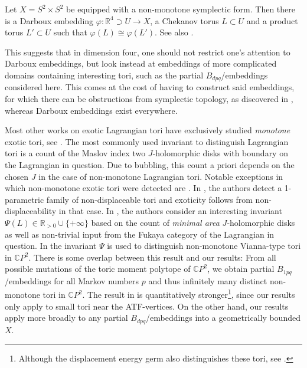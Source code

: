 \documentclass[12pt,a4paper,abstract=true,final]{scrartcl}
\begin{document}
\begin{remark}
    Let $X = S^2 \times S^2$ be equipped with a non-monotone symplectic form.
Then there is a Darboux embedding $\varphi \colon \mathbb{R}^4 \supset U \rightarrow X$, a Chekanov torus $L \subset U$ and a product torus $L' \subset U$ such that $\varphi(L) \cong \varphi(L')$.
See also \cite[Example 5.6]{brendel2023local}.
\end{remark}

This suggests that in dimension four, one should not restrict one's attention to Darboux embeddings, but look instead at embeddings of more complicated domains containing interesting tori, such as the partial $B_{dpq}$\-/embeddings considered here.
This comes at the cost of having to construct said embeddings, for which there can be obstructions from symplectic topology, as discovered in \cite{EvaSmi18}, whereas Darboux embeddings exist everywhere. 

Most other works on exotic Lagrangian tori have exclusively studied \emph{monotone} exotic tori, see \cite{Aur15, Che96, CheSch10, EliPol97, GalMik22, Via17, Via16}.
The most commonly used invariant to distinguish Lagrangian tori is a count of the Maslov index two $J$-holomorphic disks with boundary on the Lagrangian in question.
Due to bubbling, this count a priori depends on the chosen $J$ in the case of non-monotone Lagrangian tori.
Notable exceptions in which non-monotone exotic tori were detected are \cite{FOOO12, SheTonVia19}.
In \cite{FOOO12}, the authors detect a 1-parametric family of non-displaceable tori and exoticity follows from non-displaceability in that case.
In \cite{SheTonVia19}, the authors consider an interesting invariant $\Psi(L) \in \mathbb{R}_{>0} \cup \{+\infty\}$ based on the count of \emph{minimal area} $J$-holomorphic disks as well as non-trivial input from the Fukaya category of the Lagrangian in question.
In \cite[Section 7]{SheTonVia19} the invariant $\Psi$ is used to distinguish non-monotone Vianna-type tori in $\mathbb{C}P^2$.
There is some overlap between this result and our results:
From all possible mutations of the toric moment polytope of $\mathbb{C}P^2$, we obtain partial $B_{1pq}$\-/embeddings for all Markov numbers $p$ and thus infinitely many distinct non-monotone tori in $\mathbb{C}P^2$.
The result in \cite[Section 7]{SheTonVia19} is quantitatively stronger\footnote{Although the displacement energy germ also distinguishes these tori, see \cite[Example 3.7]{brendel2023local}.}, since our results only apply to small tori near the ATF-vertices.
On the other hand, our results apply more broadly to any partial $B_{dpq}$\-/embeddings into a geometrically bounded $X$.
\end{document}
